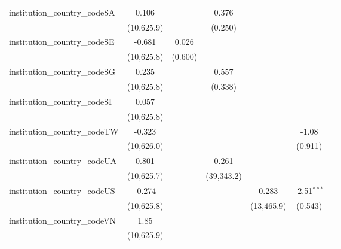 \begin{tabular}{lcccccc}
   institution\_country\_codeSA          & 0.106         &               & 0.376         &             &               &   \\   
                                         & (10,625.9)    &               & (0.250)       &             &               &   \\   
   institution\_country\_codeSE          & -0.681        & 0.026         &               &             &               &   \\   
                                         & (10,625.8)    & (0.600)       &               &             &               &   \\   
   institution\_country\_codeSG          & 0.235         &               & 0.557         &             &               &   \\   
                                         & (10,625.8)    &               & (0.338)       &             &               &   \\   
   institution\_country\_codeSI          & 0.057         &               &               &             &               &   \\   
                                         & (10,625.8)    &               &               &             &               &   \\   
   institution\_country\_codeTW          & -0.323        &               &               &             & -1.08         &   \\   
                                         & (10,626.0)    &               &               &             & (0.911)       &   \\   
   institution\_country\_codeUA          & 0.801         &               & 0.261         &             &               &   \\   
                                         & (10,625.7)    &               & (39,343.2)    &             &               &   \\   
   institution\_country\_codeUS          & -0.274        &               &               & 0.283       & -2.51$^{***}$ &   \\   
                                         & (10,625.8)    &               &               & (13,465.9)  & (0.543)       &   \\   
   institution\_country\_codeVN          & 1.85          &               &               &             &               &   \\   
                                         & (10,625.9)    &               &               &             &               &   \\   

\end{tabular}
